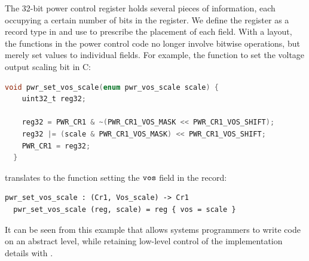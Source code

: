 The 32-bit power control register holds several pieces of information, each occupying a certain
number of bits in the register. We define the register as a record type in \cogent
and use \dargent to prescribe the placement of each field. With a \dargent layout,
the functions in the power control code no longer involve bitwise operations, but merely set values to individual fields.
For example, the function to set the voltage output scaling bit in C:
\begin{lstlisting}[language=C]
  void pwr_set_vos_scale(enum pwr_vos_scale scale) {
    uint32_t reg32;
  
    reg32 = PWR_CR1 & ~(PWR_CR1_VOS_MASK << PWR_CR1_VOS_SHIFT);
    reg32 |= (scale & PWR_CR1_VOS_MASK) << PWR_CR1_VOS_SHIFT;
    PWR_CR1 = reg32;
  }
\end{lstlisting}
translates to the \cogent function setting the $\texttt{vos}$ field in the record:
\begin{lstlisting}[language=Cogent]
  pwr_set_vos_scale : (Cr1, Vos_scale) -> Cr1
  pwr_set_vos_scale (reg, scale) = reg { vos = scale } 
\end{lstlisting}
It can be seen from this example that \cogent allows systems programmers to write code
on an abstract level, while retaining low-level control of the implementation details with \dargent{}.




